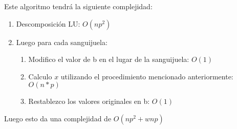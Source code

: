 Este algoritmo tendrá la siguiente complejidad:
\begin{enumerate}
 \item Descomposición LU: $O(np^2)$
 \item Luego para cada sanguijuela:
\begin{enumerate}
\item Modifico el valor de b en el lugar de la sanguijuela: $O(1)$
\item Calculo $x$ utilizando el procedimiento mencionado anteriormente: $O(n*p)$
\item Restablezco los valores originales en b: $O(1)$
\end{enumerate}  
\end{enumerate}
Luego esto da una complejidad de $O(np^2 + wnp)$

